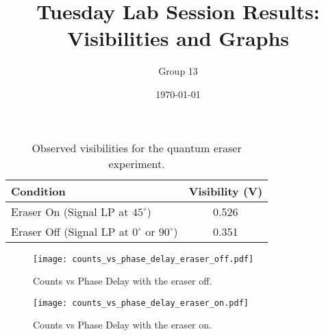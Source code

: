 \documentclass{article}
\title{Tuesday Lab Session Results: Visibilities and Graphs}
\author{Group 13} %
\date{\today}
\begin{document}
\pagestyle{empty} %

\begin{table}[h!]
\centering
\begin{tabular}{lc}
\toprule
\textbf{Condition} & \textbf{Visibility (V)} \\
\midrule
Eraser On (Signal LP at $45^\circ$)          & 0.526 \\
Eraser Off (Signal LP at $0^\circ$ or $90^\circ$) & 0.351 \\
\bottomrule
\end{tabular}
\caption{Observed visibilities for the quantum eraser experiment.}
\end{table}


\begin{figure}[h!]
\centering
\texttt{[image: counts\_vs\_phase\_delay\_eraser\_off.pdf]}
\caption{Counts vs Phase Delay with the eraser off.}
\label{fig:eraser_off}
\end{figure}


\begin{figure}[h!]
\centering
\texttt{[image: counts\_vs\_phase\_delay\_eraser\_on.pdf]}
\caption{Counts vs Phase Delay with the eraser on.}
\label{fig:eraser_on}
\end{figure}
\end{document}
